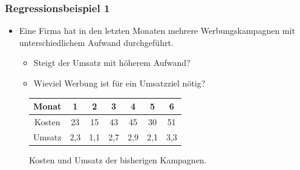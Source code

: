 \documentclass{beamer}
\begin{document}
\begin{frame}
 \frametitle{Regressionsbeispiel 1}

 \begin{itemize}
  \item Eine Firma hat in den letzten Monaten mehrere Werbungskampagnen mit unterschiedlichem Aufwand durchgef\"uhrt.
  \begin{itemize}
   \item Steigt der Umsatz mit h\"oherem Aufwand?
   \item Wieviel Werbung ist f\"ur ein Umsatzziel n\"otig?
  \end{itemize}

 \end{itemize}

 \pause
  
 \begin{figure}
    \begin{tabular}{ccccccc}
      \hline
      Monat	& 1	& 2	& 3	& 4	& 5	& 6	\\
      \hline
      Kosten	& 23	& 15	& 43	& 45	& 30	& 51	\\
      Umsatz	& 2,3	& 1,1	& 2,7	& 2,9	& 2,1	& 3,3	\\ 
      \hline
    \end{tabular}
    \caption{Kosten und Umsatz der bisherigen Kampagnen.}
 \end{figure} 

\end{frame}
\end{document}
